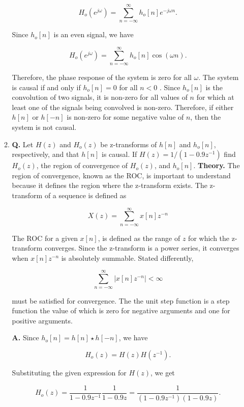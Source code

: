 \documentclass[main.tex]{subfiles}
\begin{document}
\begin{enumerate}
\begin{enumerate}
        $$
        H_o\left(e^{j \omega}\right)=\sum_{n=-\infty}^{\infty} h_o[n] e^{-j \omega n}.
        $$
        
        Since $h_o[n]$ is an even signal, we have 
        
        $$
        H_o\left(e^{j \omega}\right)=\sum_{n=-\infty}^{\infty} h_o[n] \cos (\omega n).
        $$
        
        Therefore, the phase response of the system is zero for all $\omega$. The system is causal if and only if $h_o[n]=0$ for all $n<0$ . Since $h_o[n]$ is the convolution of two signals, it is non-zero for all values of $n$ for which at least one of the signals being convolved is non-zero. Therefore, if either $h[n]$ or $h[-n]$ is non-zero for some negative value of $n$, then the system is not causal.
        
        \item \textbf{Q.} Let $H(z)$ and $H_{o}(z)$ be z-transforms of $h[n]$ and $h_{o}[n]$, respectively, and that $h[n]$ is causal. If $H(z)=1 /\left(1-0.9 z^{-1}\right)$ find $H_{o}(z)$, the region of convergence of $H_{o}(z)$, and $h_{o}[n]$. \textbf{Theory.} The region of convergence, known as the ROC, is important to understand because it defines the region where the z-transform exists. The z-transform of a sequence is defined as
        
        $$
        X(z)=\sum_{n=-\infty}^{\infty} x[n] z^{-n}
        $$
        
        The ROC for a given $x[n]$, is defined as the range of $z$ for which the z-transform converges. Since the z-transform is a power series, it converges when $x[n] z^{-n}$ is absolutely summable. Stated differently,
        
        $$
        \sum_{n=-\infty}^{\infty}\left|x[n] z^{-n}\right|<\infty
        $$
        
        must be satisfied for convergence. The the unit step function is a step function the value of which is zero for negative arguments and one for positive arguments.
        
        \textbf{A.} Since $h_o[n]=h[n] \star h[-n]$, we have 
        
        $$
        H_o(z)=H(z) H\left(z^{-1}\right).
        $$ 
        
        Substituting the given expression for $H(z)$, we get 
        
        $$
        H_o(z)=\frac{1}{1-0.9 z^{-1}} \frac{1}{1-0.9 z}=\frac{1}{\left(1-0.9 z^{-1}\right)(1-0.9 z)}.
        $$
        

\end{enumerate}
\end{enumerate}
\end{document}
